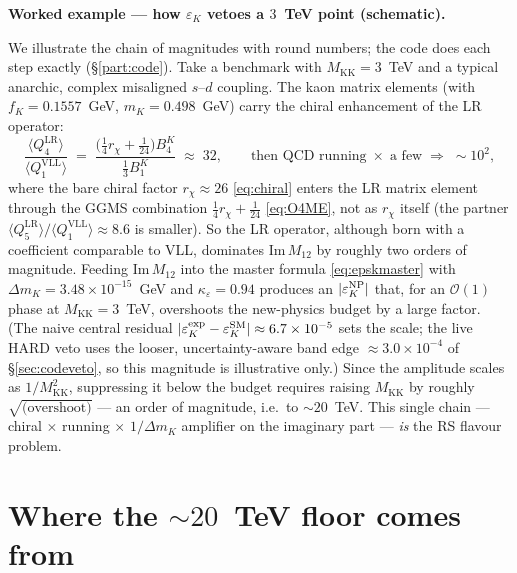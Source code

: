 \documentclass[11pt]{article}
\newenvironment{callout}[1]{%
  \par\medskip\begin{shaded}\noindent\textbf{#1}\par\smallskip}{\end{shaded}\medskip}
\newcommand{\MKK}{M_{\mathrm{KK}}}
\newcommand{\epsK}{\varepsilon_K}
\newcommand{\eps}{\varepsilon}
\newcommand{\ImMtwelve}{\mathrm{Im}\,M_{12}}
\newcommand{\dmk}{\Delta m_K}
\newcommand{\QVLL}{Q_1^{\mathrm{VLL}}}
\newcommand{\QLRfour}{Q_4^{\mathrm{LR}}}
\newcommand{\QLRfive}{Q_5^{\mathrm{LR}}}
\theoremstyle{definition}
\begin{document}
\begin{callout}{Worked example --- how $\varepsilon_K$ vetoes a $3$~TeV point (schematic).}
We illustrate the chain of magnitudes with round numbers; the code does each step
exactly (\S\ref{part:code}). Take a benchmark with $\MKK = 3$~TeV and a typical
anarchic, complex misaligned $s$--$d$ coupling. The kaon matrix elements (with
$f_K=0.1557$~GeV, $m_K=0.498$~GeV) carry the chiral enhancement of the LR
operator:
\[
\frac{\langle \QLRfour\rangle}{\langle\QVLL\rangle}
\;=\; \frac{\big(\tfrac14 r_\chi+\tfrac{1}{24}\big)B_4^K}{\tfrac13 B_1^K}
\;\approx\; 32 ,
\qquad \text{then QCD running} \;\times\; \text{a few}
\;\Rightarrow\; \sim 10^2 ,
\]
where the bare chiral factor $r_\chi\approx26$ \eqref{eq:chiral} enters the LR
matrix element through the GGMS combination $\tfrac14 r_\chi+\tfrac{1}{24}$
\eqref{eq:O4ME}, not as $r_\chi$ itself (the partner $\langle\QLRfive\rangle/%
\langle\QVLL\rangle\approx8.6$ is smaller). So the LR operator, although born
with a coefficient comparable to VLL, dominates $\ImMtwelve$ by roughly two orders
of magnitude. Feeding $\ImMtwelve$ into the master formula \eqref{eq:epskmaster}
with $\dmk = 3.48\times10^{-15}$~GeV and $\kappa_\eps=0.94$ produces an
$|\epsK^{\rm NP}|$ that, for an $\mathcal{O}(1)$ phase at $\MKK=3$~TeV, overshoots
the new-physics budget by a large factor. (The naive central residual
$|\epsK^{\rm exp}-\epsK^{\rm SM}|\approx6.7\times10^{-5}$ sets the scale; the live
HARD veto uses the looser, uncertainty-aware band edge $\approx3.0\times10^{-4}$
of \S\ref{sec:codeveto}, so this magnitude is illustrative only.)
Since the amplitude scales as $1/\MKK^2$, suppressing it below the budget requires
raising $\MKK$ by roughly $\sqrt{\text{(overshoot)}}$ --- an order of magnitude,
i.e.\ to $\sim20$~TeV. This single chain --- chiral $\times$ running $\times$
$1/\dmk$ amplifier on the imaginary part --- \emph{is} the RS flavour problem.
\end{callout}

\section{Where the $\sim20$~TeV floor comes from}
\label{sec:floor}
\end{document}

